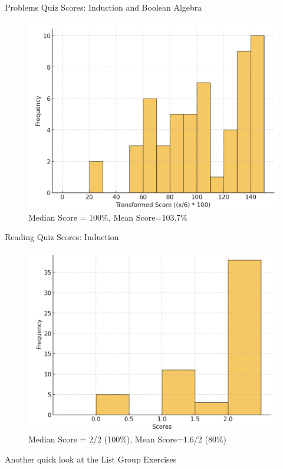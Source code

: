 \documentclass[10pt]{beamer}
\begin{document}
\begin{frame}{Problems Quiz Scores: Induction and Boolean Algebra}

\begin{figure}[ht]
        \centering
        \includegraphics[width=.8\textwidth]{images/problems_quiz_scores}
        \caption{Median Score = 100\%, Mean Score=103.7\%}
\end{figure}
\vfill 

\end{frame}


\begin{frame}{Reading Quiz Scores: Induction}

\begin{figure}[ht]
        \centering
        \includegraphics[width=.8\textwidth]{images/reading_quiz_scores}
   		 \caption{Median Score = 2/2 (100\%), Mean Score=1.6/2 (80\%)}
\end{figure}
\vfill 

\end{frame}

\begin{frame}[standout]
Another quick look at the List Group Exercises	
\end{frame}
\end{document}

